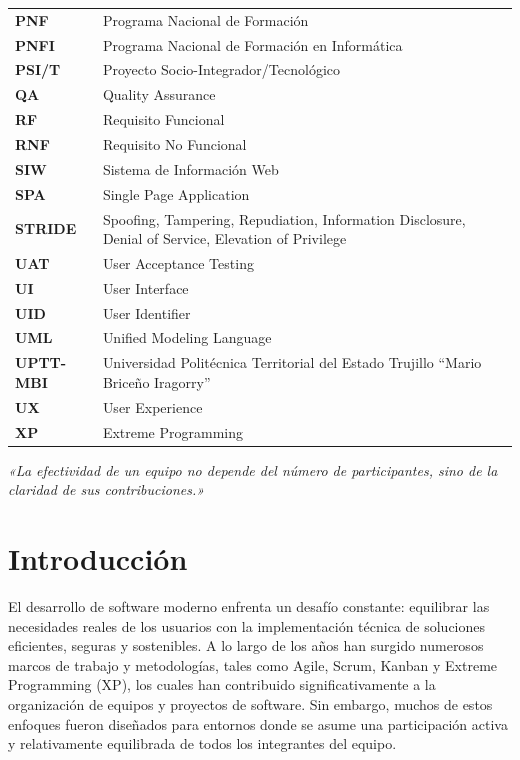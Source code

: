 \documentclass[14pt,a4paper,oneside]{extbook}
\begin{document}
{\begin{center}
\begin{tabular}{l p{10cm}}
\textbf{\color{primary}PNF} & Programa Nacional de Formación \\
\textbf{\color{primary}PNFI} & Programa Nacional de Formación en Informática \\
\textbf{\color{primary}PSI/T} & Proyecto Socio-Integrador/Tecnológico \\
\textbf{\color{primary}QA} & Quality Assurance \\
\textbf{\color{primary}RF} & Requisito Funcional \\
\textbf{\color{primary}RNF} & Requisito No Funcional \\
\textbf{\color{primary}SIW} & Sistema de Información Web \\
\textbf{\color{primary}SPA} & Single Page Application \\
\textbf{\color{primary}STRIDE} & Spoofing, Tampering, Repudiation, Information Disclosure, Denial of Service, Elevation of Privilege \\
\textbf{\color{primary}UAT} & User Acceptance Testing \\
\textbf{\color{primary}UI} & User Interface \\
\textbf{\color{primary}UID} & User Identifier \\
\textbf{\color{primary}UML} & Unified Modeling Language \\
\textbf{\color{primary}UPTT-MBI} & Universidad Politécnica Territorial del Estado Trujillo \enquote{Mario Briceño Iragorry} \\
\textbf{\color{primary}UX} & User Experience \\
\textbf{\color{primary}XP} & Extreme Programming \\
\bottomrule
\end{tabular}
\end{center}
}
\newpage

\cleardoublepage
\thispagestyle{empty}
\vspace*{\fill}
\begin{flushright}
\begin{minipage}{0.6\textwidth}
\large\itshape
«La efectividad de un equipo no depende del número de participantes, sino de la claridad de sus contribuciones.»
\end{minipage}
\end{flushright}
\vspace*{\fill}
\newpage

\mainmatter
\chapter{Introducción}
El desarrollo de software moderno enfrenta un desafío constante: equilibrar las necesidades reales de los usuarios con la implementación técnica de soluciones eficientes, seguras y sostenibles. A lo largo de los años han surgido numerosos marcos de trabajo y metodologías, tales como Agile, Scrum, Kanban y Extreme Programming (XP), los cuales han contribuido significativamente a la organización de equipos y proyectos de software. Sin embargo, muchos de estos enfoques fueron diseñados para entornos donde se asume una participación activa y relativamente equilibrada de todos los integrantes del equipo.
\end{document}
